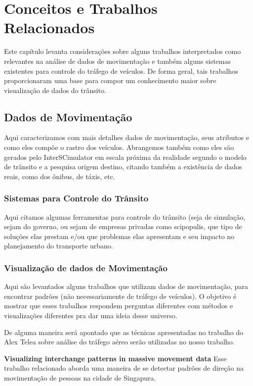 \chapter{Conceitos e Trabalhos Relacionados}
\label{cap:trabalhos-relacionados}

Este capítulo levanta considerações sobre alguns trabalhos interpretados como
relevantes na análise de dados de movimentação e também alguns sistemas existentes
para controle do tráfego de veículos. De forma geral, tais trabalhos proporcionaram uma base
para compor um conhecimento maior sobre visualização de dados do trânsito.

\section{Dados de Movimentação}
Aqui caracterizamos com mais detalhes dados de movimentação, seus atributos
e como eles compõe o rastro dos veículos. Abrangemos também como eles são
gerados pelo InterSCimulator em escala próxima da realidade segundo o modelo
de trânsito e a pesquisa origem destino, citando também a existência de dados
reais, como dos ônibus, de táxis, etc.

\subsection{Sistemas para Controle do Trânsito}

Aqui citamos algumas ferramentas para controle do trânsito (seja de simulação, sejam do governo, ou
sejam de empresas privadas como scipopulis, que tipo de soluções elas prestam e/ou
que problemas elas apresentam e seu impacto no planejamento do transporte urbano.

\subsection{Visualização de dados de Movimentação}
Aqui são levantados alguns trabalhos que utilizam dados de movimentação,
para encontrar padrões (não necessariamente de tráfego de veículos). O objetivo
é mostrar que esses trabalhos respondem perguntas diferentes com métodos
e visualizações diferentes pra dar uma ideia desse universo.

De alguma maneira será apontado que as técnicas apresentadas no trabalho do
Alex Telea sobre análise do tráfego aéreo serão utilizadas no nosso trabalho.

\textbf{Visualizing interchange patterns in massive movement data}
 Esse trabalho relacionado aborda uma maneira de se detectar padrões de direção
na movimentação de pessoas na cidade de Singapura.

